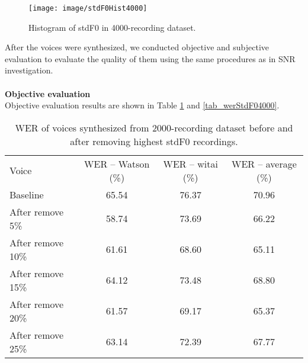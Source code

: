 \documentclass[12pt]{article}
\begin{document}
\begin{figure}[t]
\begin{center}
\texttt{[image: image/stdF0Hist4000]}
\end{center}
\vspace{-0.3cm}
\caption[Histogram of stdF0 in 4000-recording dataset.]{Histogram of stdF0 in 4000-recording dataset.}
\label{fig_stdF0Hist4000}
\end{figure}

After the voices were synthesized, we conducted objective and subjective evaluation to evaluate the quality of them using the same procedures as in SNR investigation.\\\\
\textbf{Objective evaluation}
\vspace{0.28cm}\\
Objective evaluation results are shown in Table \ref{tab_werStdF02000} and \ref{tab_werStdF04000}.

\begin{table}[]
\begin{center}
\caption{WER of voices synthesized from 2000-recording dataset before and after removing highest stdF0 recordings.}
\label{tab_werStdF02000}
\vspace{3mm}
\begin{tabular}{lccc}
\hline
Voice & WER – Watson (\%) & WER – witai (\%) & WER – average (\%)\\
\cmidrule(l{0pt}r{2pt}){1-1}\cmidrule(l{0pt}r{2pt}){2-2}\cmidrule(l{0pt}r{2pt}){3-3}\cmidrule(l{0pt}r{2pt}){4-4}
Baseline          & 65.54 & 76.37 & 70.96 \\
After remove 5\%  & 58.74 & 73.69 & 66.22 \\
After remove 10\% & 61.61 & 68.60 & 65.11 \\
After remove 15\% & 64.12 & 73.48 & 68.80 \\
After remove 20\% & 61.57 & 69.17 & 65.37 \\
After remove 25\% & 63.14 & 72.39 & 67.77 \\
\hline
\end{tabular}
\end{center}
\end{table}
\end{document}
